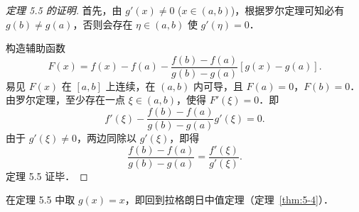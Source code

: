 \begin{proof}[定理 5.5 的证明]
首先，由 $g'(x) \neq 0$ ($x \in (a, b)$)，根据罗尔定理可知必有 $g(b) \neq g(a)$，否则会存在 $\eta \in (a, b)$ 使 $g'(\eta) = 0$．

构造辅助函数
\[
F(x) = f(x) - f(a) - \frac{f(b) - f(a)}{g(b) - g(a)}[g(x) - g(a)].
\]
易见 $F(x)$ 在 $[a, b]$ 上连续，在 $(a, b)$ 内可导，且 $F(a) = 0$，$F(b) = 0$．由罗尔定理，至少存在一点 $\xi \in (a, b)$，使得 $F'(\xi) = 0$．即
\[
f'(\xi) - \frac{f(b) - f(a)}{g(b) - g(a)} g'(\xi) = 0.
\]
由于 $g'(\xi) \neq 0$，两边同除以 $g'(\xi)$，即得
\[
\frac{f(b) - f(a)}{g(b) - g(a)} = \frac{f'(\xi)}{g'(\xi)}.
\]
定理 5.5 证毕．
\end{proof}

在定理 5.5 中取 $g(x)=x$，即回到拉格朗日中值定理（定理~\ref{thm:5-4}）．

